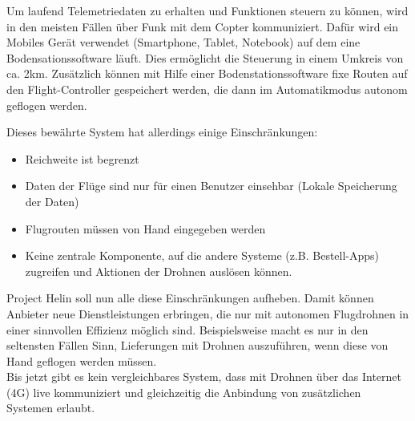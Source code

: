 Um laufend Telemetriedaten zu erhalten und Funktionen steuern zu können, wird in den meisten Fällen über Funk mit dem Copter kommuniziert. Dafür wird ein Mobiles Gerät verwendet (Smartphone, Tablet, Notebook) auf dem eine Bodensationssoftware läuft. Dies ermöglicht die Steuerung in einem Umkreis von ca. 2km. Zusätzlich können mit Hilfe einer Bodenstationssoftware fixe Routen auf den \Gls{Flight-Controller} gespeichert werden, die dann im Automatikmodus autonom geflogen werden.

\newpage
Dieses bewährte System hat allerdings einige Einschränkungen: 

\begin{itemize}
	\item{Reichweite ist begrenzt}
	\item{Daten der Flüge sind nur für einen Benutzer einsehbar (Lokale Speicherung der Daten)}
	\item{Flugrouten müssen von Hand eingegeben werden}
	\item{Keine zentrale Komponente, auf die andere Systeme (z.B. Bestell-Apps) zugreifen und Aktionen der Drohnen auslösen können.}
\end{itemize}

Project Helin soll nun alle diese Einschränkungen aufheben. Damit können Anbieter neue Dienstleistungen erbringen, die nur mit autonomen Flugdrohnen in einer sinnvollen Effizienz möglich sind. Beispielsweise macht es nur in den seltensten Fällen Sinn, Lieferungen mit Drohnen auszuführen, wenn diese von Hand geflogen werden müssen. \\

Bis jetzt gibt es kein vergleichbares System, dass mit Drohnen über das Internet (4G) live kommuniziert und gleichzeitig die Anbindung von zusätzlichen Systemen erlaubt.

